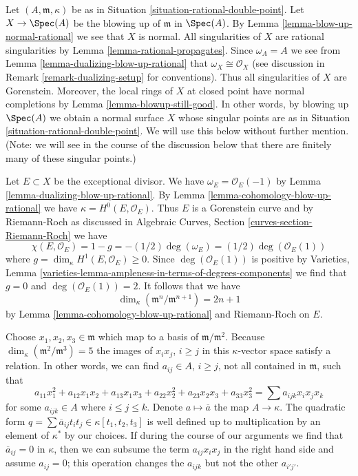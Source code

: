 \noindent
Let $(A, \mathfrak m, \kappa)$ be as in
Situation \ref{situation-rational-double-point}.
Let $X \to \Spec(A)$ be the blowing up of $\mathfrak m$ in $\Spec(A)$.
By Lemma \ref{lemma-blow-up-normal-rational} we see that $X$ is normal.
All singularities of $X$ are rational singularities
by Lemma \ref{lemma-rational-propagates}.
Since $\omega_A = A$ we see from Lemma \ref{lemma-dualizing-blow-up-rational}
that $\omega_X \cong \mathcal{O}_X$ (see discussion in
Remark \ref{remark-dualizing-setup} for conventions).
Thus all singularities of $X$ are Gorenstein.
Moreover, the local rings of $X$ at closed point have
normal completions by Lemma \ref{lemma-blowup-still-good}.
In other words, by blowing up $\Spec(A)$ we obtain a normal
surface $X$ whose singular points are as in
Situation \ref{situation-rational-double-point}.
We will use this below without further mention.
(Note: we will see in the course of the discussion below
that there are finitely many of these singular points.)

\medskip\noindent
Let $E \subset X$ be the exceptional divisor. We have
$\omega_E = \mathcal{O}_E(-1)$ by Lemma \ref{lemma-dualizing-blow-up-rational}.
By Lemma \ref{lemma-cohomology-blow-up-rational} we have
$\kappa = H^0(E, \mathcal{O}_E)$.
Thus $E$ is a Gorenstein curve and by Riemann-Roch as discussed in
Algebraic Curves, Section \ref{curves-section-Riemann-Roch}
we have
$$
\chi(E, \mathcal{O}_E) = 1 - g = -(1/2) \deg(\omega_E) =
(1/2)\deg(\mathcal{O}_E(1))
$$
where $g = \dim_\kappa H^1(E, \mathcal{O}_E) \geq 0$.
Since $\deg(\mathcal{O}_E(1))$ is positive
by Varieties, Lemma
\ref{varieties-lemma-ampleness-in-terms-of-degrees-components}
we find that $g = 0$ and $\deg(\mathcal{O}_E(1)) = 2$. It follows that
we have
$$
\dim_\kappa (\mathfrak m^n/\mathfrak m^{n + 1}) = 2n + 1
$$
by Lemma \ref{lemma-cohomology-blow-up-rational} and Riemann-Roch
on $E$.

\medskip\noindent
Choose $x_1, x_2, x_3 \in \mathfrak m$ which map to a basis of
$\mathfrak m/\mathfrak m^2$. Because
$\dim_\kappa(\mathfrak m^2/\mathfrak m^3) = 5$
the images of $x_i x_j$, $i \geq j$ in this $\kappa$-vector space
satisfy a relation. In other words, we can find $a_{ij} \in A$,
$i \geq j$, not all contained in $\mathfrak m$, such that
$$
a_{11} x_1^2 + a_{12} x_1x_2 + a_{13}x_1x_3 + a_{22} x_2^2 +
a_{23} x_2x_3 + a_{33} x_3^2 =
\sum a_{ijk} x_ix_jx_k
$$
for some $a_{ijk} \in A$ where $i \leq j \leq k$. Denote
$a \mapsto \overline{a}$ the map $A \to \kappa$.
The quadratic form
$q = \sum \overline{a}_{ij} t_i t_j \in \kappa[t_1, t_2, t_3]$
is well defined up to multiplication by an element of $\kappa^*$
by our choices. If during the course of our arguments we find
that $\overline{a}_{ij} = 0$ in $\kappa$,
then we can subsume the term $a_{ij} x_i x_j$ in the right
hand side and assume $a_{ij} = 0$; this operation changes the $a_{ijk}$
but not the other $a_{i'j'}$.

